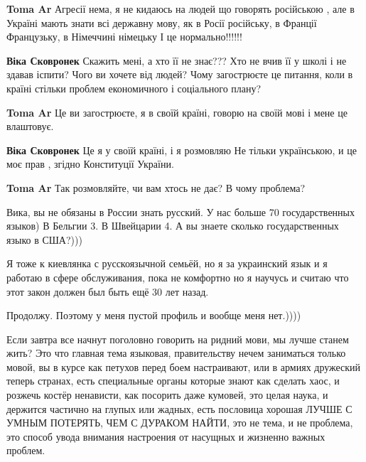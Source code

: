 \begin{itemize}
\begin{itemize}
\textbf{Toma Ar} Агресії нема, я не кидаюсь на людей що говорять російською , але в Україні мають знати всі державну мову, як в Росії російську, в Франції Французьку, в Німеччині німецьку І це нормально!!!!!!

\textbf{Віка Сковронек} Скажить мені, а хто її не знає??? Хто не вчив її у школі і не здавав іспити? Чого ви хочете від людей? Чому загострюєте це питання, коли в країні стільки проблем економичного і соціального плану?

\textbf{Toma Ar} Це ви загострюєте, я в своїй країні, говорю на своїй мові і мене це влаштовує.

\textbf{Віка Сковронек} Це я у своїй країні, і я розмовляю Не тільки українською, и це моє прав , згідно Конституції України.

\textbf{Toma Ar} Так розмовляйте, чи вам хтось не дає? В чому проблема?

Вика, вы не обязаны в России знать русский. У нас больше 70 государственных языков) В Бельгии 3. В Швейцарии 4.
А вы знаете сколько государственных языко в США?)))
\end{itemize}

Я тоже к киевлянка с русскоязычной семьёй, но я за украинский язык и я работаю в сфере обслуживания, пока не комфортно но я научусь и считаю что этот закон должен был быть ещё 30 лет назад.

\begin{itemize}
Продолжу. Поэтому у меня пустой профиль и вообще меня нет.))))
\end{itemize}


Если завтра все начнут поголовно говорить на ридний мови, мы лучше станем жить?
Это что главная тема языковая, правительству нечем заниматься только мовой, вы
в курсе как петухов перед боем настраивают, или в армиях дружеский теперь
странах, есть специальные органы которые знают как сделать хаос, и розжечь
костёр ненависти, как посорить даже кумовей, это целая наука, и держится
частично на глупых или жадных, есть пословица хорошая ЛУЧШЕ С УМНЫМ ПОТЕРЯТЬ,
ЧЕМ С ДУРАКОМ НАЙТИ, это не тема, и не проблема, это способ увода внимания
настроения от насущных и жизненно важных проблем.


\end{itemize}
